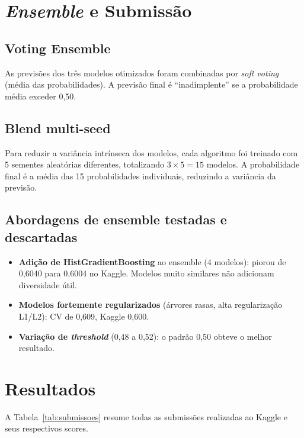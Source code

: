 \documentclass[12pt, a4paper]{article}
\begin{document}
\section{\textit{Ensemble} e Submissão}

\subsection{Voting Ensemble}

As previsões dos três modelos otimizados foram combinadas por \textit{soft voting} (média das probabilidades). A previsão final é ``inadimplente'' se a probabilidade média exceder 0,50.

\subsection{Blend multi-seed}

Para reduzir a variância intrínseca dos modelos, cada algoritmo foi treinado com 5 sementes aleatórias diferentes, totalizando $3 \times 5 = 15$ modelos. A probabilidade final é a média das 15 probabilidades individuais, reduzindo a variância da previsão.

\subsection{Abordagens de ensemble testadas e descartadas}

\begin{itemize}[leftmargin=2em]
  \item \textbf{Adição de HistGradientBoosting} ao ensemble (4 modelos): piorou de 0,6040 para 0,6004 no Kaggle. Modelos muito similares não adicionam diversidade útil.
  \item \textbf{Modelos fortemente regularizados} (árvores rasas, alta regularização L1/L2): CV de 0,609, Kaggle 0,600.
  \item \textbf{Variação de \textit{threshold}} (0,48 a 0,52): o padrão 0,50 obteve o melhor resultado.
\end{itemize}

\section{Resultados}

A Tabela~\ref{tab:submissoes} resume todas as submissões realizadas ao Kaggle e seus respectivos scores.
\end{document}
